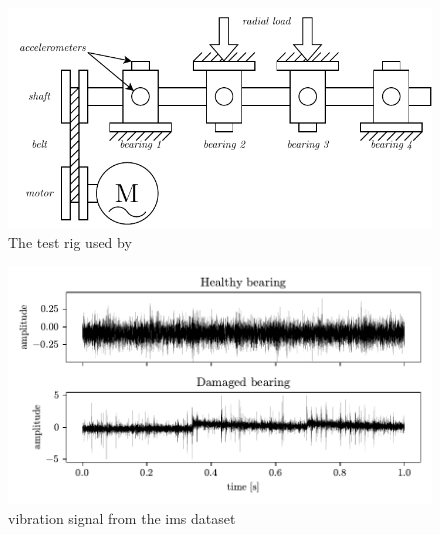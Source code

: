 \begin{figure}
    \centering
    \includegraphics[scale=1]{images/FeatureExtraction/testrig.pdf}
    \caption{The test rig used by \cite{lee2007bearingdataset}}
    \label{fig:IMS_bearing_dataset}
\end{figure}

\begin{figure}
    \centering
    \includegraphics[scale=1]{images/FeatureExtraction/TD_signal.pdf}
    \caption{ vibration signal from the \gls{ims} dataset}
    \label{fig:IMS_bearing}
\end{figure}

